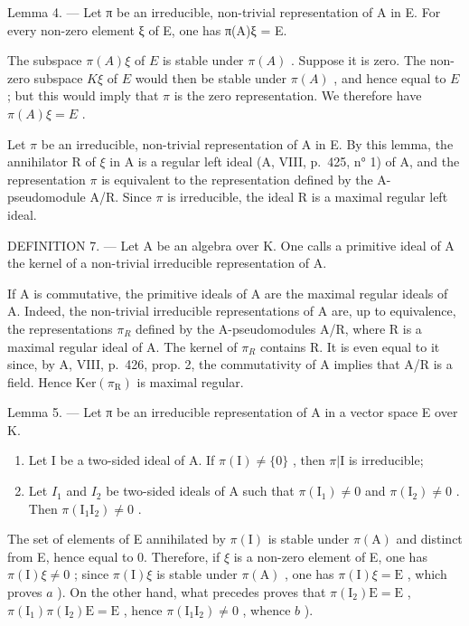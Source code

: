 Lemma 4. --- Let π be an irreducible, non-trivial representation of A in E. For every non-zero element ξ of E, one has π(A)ξ = E.

The subspace \(\pi(A)\xi\) of \(E\) is stable under \(\pi(A)\) . Suppose it is zero. The non-zero subspace \(K\xi\) of \(E\) would then be stable under \(\pi(A)\) , and hence equal to \(E\) ; but this would imply that \(\pi\) is the zero representation. We therefore have \(\pi(A)\xi = E\) .

Let \(\pi\) be an irreducible, non-trivial representation of A in E. By this lemma, the annihilator R of \(\xi\) in A is a regular left ideal (A, VIII, p.~425, n° 1) of A, and the representation \(\pi\) is equivalent to the representation defined by the A-pseudomodule A/R. Since \(\pi\) is irreducible, the ideal R is a maximal regular left ideal.

DEFINITION 7. --- Let A be an algebra over K. One calls a primitive ideal of A the kernel of a non-trivial irreducible representation of A.

If A is commutative, the primitive ideals of A are the maximal regular ideals of A. Indeed, the non-trivial irreducible representations of A are, up to equivalence, the representations \(\pi_{R}\) defined by the A-pseudomodules A/R, where R is a maximal regular ideal of A. The kernel of \(\pi_{R}\) contains R. It is even equal to it since, by A, VIII, p.~426, prop. 2, the commutativity of A implies that A/R is a field. Hence \(\text{Ker}(\pi_{\text{R}})\) is maximal regular.

Lemma 5. --- Let π be an irreducible representation of A in a vector space E over K.

\begin{enumerate}
\def\labelenumi{\alph{enumi})}
\item
  Let I be a two-sided ideal of A. If \(\pi(\mathrm{I}) \neq \{0\}\) , then \(\pi|\mathrm{I}\) is irreducible;
\item
  Let \(I_{1}\) and \(I_{2}\) be two-sided ideals of A such that \(\pi(\mathrm{I}_{1}) \neq 0\) and \(\pi(\mathrm{I}_{2}) \neq 0\) . Then \(\pi(\mathrm{I}_{1}\mathrm{I}_{2}) \neq 0\) .
\end{enumerate}

The set of elements of E annihilated by \(\pi(\mathrm{I})\) is stable under \(\pi(\mathrm{A})\) and distinct from E, hence equal to 0. Therefore, if \(\xi\) is a non-zero element of E, one has \(\pi(\mathrm{I})\xi \neq 0\) ; since \(\pi(\mathrm{I})\xi\) is stable under \(\pi(\mathrm{A})\) , one has \(\pi(\mathrm{I})\xi = \mathrm{E}\) , which proves \(a\) ). On the other hand, what precedes proves that \(\pi(\mathrm{I}_2)\mathrm{E} = \mathrm{E}\) , \(\pi(\mathrm{I}_1)\pi(\mathrm{I}_2)\mathrm{E} = \mathrm{E}\) , hence \(\pi(\mathrm{I}_1\mathrm{I}_2) \neq 0\) , whence \(b\) ).

